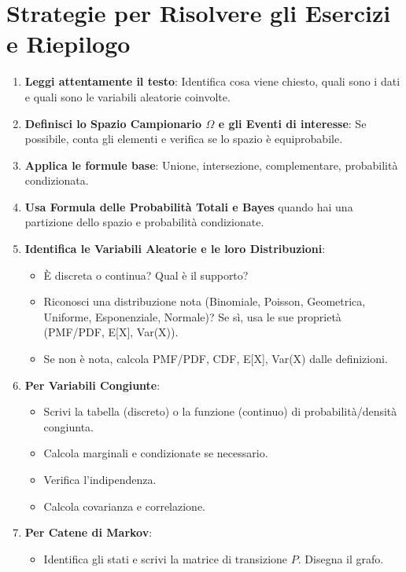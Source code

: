 \documentclass[12pt,a4paper]{article}
\begin{document}
\chapter{Strategie per Risolvere gli Esercizi e Riepilogo}
\begin{enumerate}
    \item \textbf{Leggi attentamente il testo}: Identifica cosa viene chiesto, quali sono i dati e quali sono le variabili aleatorie coinvolte.
    \item \textbf{Definisci lo Spazio Campionario $\Omega$ e gli Eventi di interesse}: Se possibile, conta gli elementi e verifica se lo spazio è equiprobabile.
    \item \textbf{Applica le formule base}: Unione, intersezione, complementare, probabilità condizionata.
    \item \textbf{Usa Formula delle Probabilità Totali e Bayes} quando hai una partizione dello spazio e probabilità condizionate.
    \item \textbf{Identifica le Variabili Aleatorie e le loro Distribuzioni}:
        \begin{itemize}
            \item È discreta o continua? Qual è il supporto?
            \item Riconosci una distribuzione nota (Binomiale, Poisson, Geometrica, Uniforme, Esponenziale, Normale)? Se sì, usa le sue proprietà (PMF/PDF, E[X], Var(X)).
            \item Se non è nota, calcola PMF/PDF, CDF, E[X], Var(X) dalle definizioni.
        \end{itemize}
    \item \textbf{Per Variabili Congiunte}:
        \begin{itemize}
            \item Scrivi la tabella (discreto) o la funzione (continuo) di probabilità/densità congiunta.
            \item Calcola marginali e condizionate se necessario.
            \item Verifica l'indipendenza.
            \item Calcola covarianza e correlazione.
        \end{itemize}
    \item \textbf{Per Catene di Markov}:
        \begin{itemize}
            \item Identifica gli stati e scrivi la matrice di transizione $P$. Disegna il grafo.

\end{itemize}
\end{enumerate}
\end{document}
